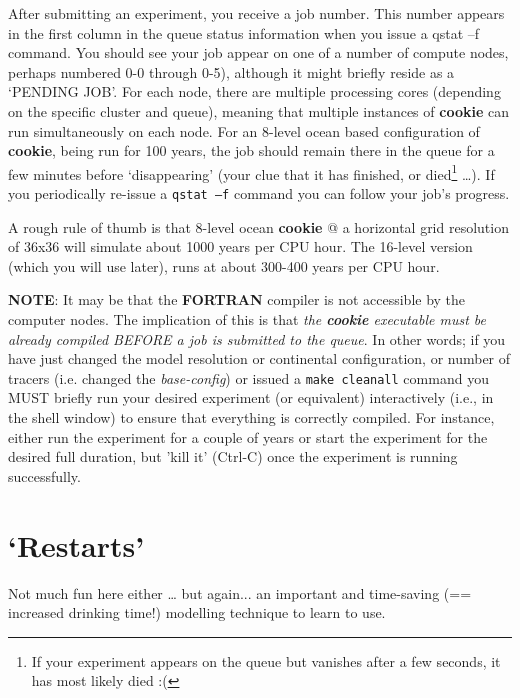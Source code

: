 \vspace{1mm}
After submitting an experiment, you receive a job number. This number appears in the first column in the queue status information when you issue a qstat –f command. You should see your job appear on one of a number of compute nodes, perhaps numbered 0-0 through 0-5), although it might briefly reside as a ‘\textsf{\footnotesize PENDING JOB}’. For each node, there are multiple processing cores (depending on the specific cluster and queue), meaning that multiple instances of \textbf{cookie} can run simultaneously on each node. For an 8-level ocean based configuration of \textbf{cookie}, being run for 100 years, the job should remain there in the queue for a few minutes before ‘disappearing’ (your clue that it has finished, or died\footnote{If your experiment appears on the queue but vanishes after a few seconds, it has most likely died :(} …). If you periodically re-issue a \texttt{qstat –f} command you can follow your job’s progress.

A rough rule of thumb is that 8-level ocean \textbf{cookie} @ a horizontal grid resolution of 36x36 will simulate about 1000 years per CPU hour. The 16-level version (which you will use later), runs at about 300-400 years per CPU hour.

\vspace{1mm}
\noindent \textbf{NOTE}: It may be that the \textbf{FORTRAN} compiler is not accessible by the computer nodes. The implication of this is that \textit{the \textbf{cookie} executable must be already compiled BEFORE a job is submitted to the queue}. In other words; if you have just changed the model resolution or continental configuration, or number of tracers (i.e. changed the \textit{base-config}) or issued a \texttt{make cleanall} command you MUST briefly run your desired experiment (or equivalent) interactively (i.e., in the shell window) to ensure that everything is correctly compiled. For instance, either run the experiment for a couple of years or start the experiment for the desired full duration, but 'kill it' (\textsf{\small Ctrl-C}) once the experiment is running successfully.

\newpage

\section{‘Restarts’}

Not much fun here either … but again... an important and time-saving (== increased drinking time!) modelling technique to learn to use.

